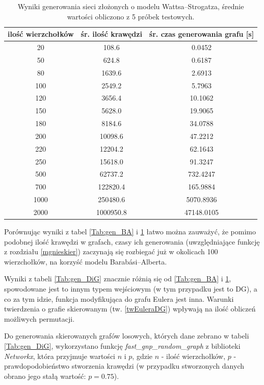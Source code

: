 \documentclass[a4paper, 12pt, twoside, openright]{article}
\begin{document}
\begin{table}[ht]
	\centering
	\caption{Wyniki generowania sieci złożonych o modelu Wattsa–Strogatza, średnie wartości obliczono z 5 próbek testowych.}
	\resizebox{14.5cm}{!}
	{
	\begin{tabular}{|c c c|}
		\hline
		ilość wierzchołków	& śr. ilość krawędzi 		& śr. czas generowania grafu [s]\\ \hline \hline
		20 	& 108.6  		& 0.0452 	\\ \hline
		50 	& 624.8 		& 0.6187 	\\ \hline
		80 	& 1639.6        & 2.6913	\\ \hline
		100 & 2549.2        & 5.7963	\\ \hline
		120 & 3656.4        & 10.1062	\\ \hline
		150 & 5628.0   		& 19.9065	\\ \hline
		180 & 8184.6        & 34.0788	\\ \hline
		200 & 10098.6 		& 47.2212	\\ \hline
		220 & 12204.2 		& 62.1643	\\ \hline
		250 & 15618.0 		& 91.3247	\\ \hline
		500 & 62737.2 		& 732.4247	\\ \hline				
		700 & 122820.4      & 165.9884	\\ \hline
		1000& 250480.6	    & 5070.8936 \\ \hline
		2000& 1000950.8    	& 47148.0105\\ \hline
	\end{tabular} 
	}
	\label{Tab:gen_WS}
\end{table}

Porównując wyniki z tabel \ref{Tab:gen_BA} i \ref{Tab:gen_WS} łatwo można zauważyć, że pomimo podobnej ilość krawędzi w grafach, czasy ich generowania (uwzględniające funkcję z rozdziału \ref{mgnieskier}) zaczynają się rozbiegać już w okolicach 100 wierzchołków, na korzyść modelu Barabási–Alberta.

Wyniki z tabeli \ref{Tab:gen_DiG} znacznie różnią się od \ref{Tab:gen_BA} i \ref{Tab:gen_WS}, spowodowane jest to innym typem wejściowym (w tym przypadku jest to DG), a co za tym idzie, funkcja modyfikująca do grafu Eulera jest inna. Warunki twierdzenia o grafie skierowanym (tw. \ref{twEuleraDG}) wpływają na ilość obliczeń możliwych permutacji. 

Do generowania skierowanych grafów losowych, których dane zebrano w tabeli \ref{Tab:gen_DiG}, wykorzystano funkcję \textit{fast\_gnp\_random\_graph} z biblioteki \textit{Networkx}, która przyjmuje wartości $n$ i $p$, gdzie $n$ - ilość wierzchołków, $p$ - prawdopodobieństwo stworzenia krawędzi (w przypadku stworzonych danych obrano jego stałą wartość: $p= 0.75$).
\end{document}
